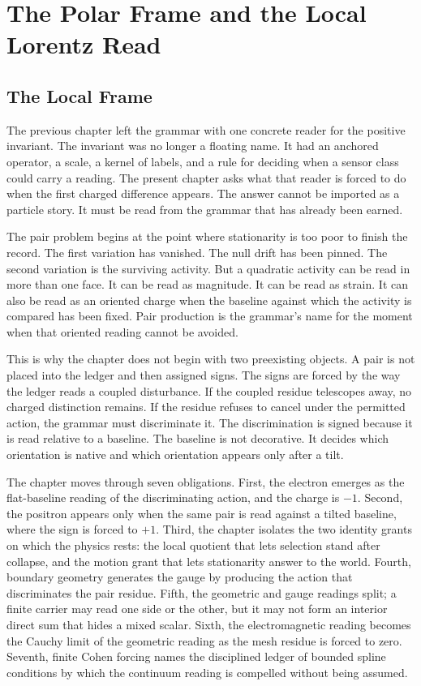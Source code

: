 \chapter[Polar Frame and Lorentz Read]{The Polar Frame and the Local Lorentz Read}
\label{chap:pair-production-geometry-generating-gauge}

\section{The Local Frame}

The previous chapter left the grammar with one concrete reader for the
positive invariant. The invariant was no longer a floating name. It had an
anchored operator, a scale, a kernel of labels, and a rule for deciding when a
sensor class could carry a reading. The present chapter asks what that
reader is forced to do when the first charged difference appears. The answer
cannot be imported as a particle story. It must be read from the grammar that
has already been earned.

The pair problem begins at the point where stationarity is too poor to
finish the record. The first variation has vanished. The null drift has been
pinned. The second variation is the surviving activity. But a quadratic
activity can be read in more than one face. It can be read as magnitude. It
can be read as strain. It can also be read as an oriented charge when the
baseline against which the activity is compared has been fixed. Pair
production is the grammar's name for the moment when that oriented reading
cannot be avoided.

This is why the chapter does not begin with two preexisting objects. A pair
is not placed into the ledger and then assigned signs. The signs are forced
by the way the ledger reads a coupled disturbance. If the coupled residue
telescopes away, no charged distinction remains. If the residue refuses to
cancel under the permitted action, the grammar must discriminate it. The
discrimination is signed because it is read relative to a baseline. The
baseline is not decorative. It decides which orientation is native and which
orientation appears only after a tilt.

The chapter moves through seven obligations. First, the electron emerges as
the flat-baseline reading of the discriminating action, and the charge is
\(-1\). Second, the positron appears only when the same pair is read against
a tilted baseline, where the sign is forced to \(+1\). Third, the chapter
isolates the two identity grants on which the physics rests: the local
quotient that lets selection stand after collapse, and the motion grant that
lets stationarity answer to the world. Fourth, boundary geometry generates
the gauge by producing the action that discriminates the pair residue. Fifth,
the geometric and gauge readings split; a finite carrier may read one side or
the other, but it may not form an interior direct sum that hides a mixed
scalar. Sixth, the electromagnetic reading becomes the Cauchy limit of the
geometric reading as the mesh residue is forced to zero. Seventh, finite
Cohen forcing names the disciplined ledger of bounded spline conditions by
which the continuum reading is compelled without being assumed.

